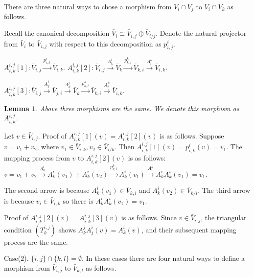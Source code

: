 \def\CTEXPreproc{Created by ctex v0.2.12, don't edit!}\documentclass[11pt]{article}
\newtheorem{lem}{Lemma}[section]
\begin{document}
 There are three natural ways to chose a morphism  from $V_i \cap V_j$ to $V_i \cap V_k$ as follows.

 Recall the canonical decomposition $\bar{V}_i \cong \bar{V}_{i,j} \oplus \bar{V}_{i/j}$. Denote the natural projector from $\bar{V}_i$ to $\bar{V}_{i,j}$ with respect to this decomposition as $p^i _{i,j}$.

 $A^{i,j} _{i,k} [1] :  \bar{V}_{i,j} \stackrel{ p^i _{i,k} }{\longrightarrow } \bar{V}_{i,k} $.
 $A^{i,j} _{i,k}[2] :  \bar{V}_{i,j} \stackrel{A^i _k }{\longrightarrow  } \bar{V}_k
  \stackrel{p^k _{k,i}}{\longrightarrow} \bar{V}_{k,i}\stackrel{A^k _i }{\longrightarrow} \bar{V}_{i,k} $.


  $A^{i,j} _{i,k} [3]: \bar{V}_{i,j}\stackrel{A^i _j }{\longrightarrow } \bar{V}_{j,i} \stackrel{ A^j _k }{\longrightarrow} \bar{V}_k
  \stackrel{ p^k _{k,i}}{\longrightarrow} \bar{V}_{k,i} \stackrel{A^k _i }{\longrightarrow } \bar{V}_{i,k} $.



\begin{lem}
Above three morphisms are the same. We denote this morphism as $A^{i,j}_{i,k} $.

\end{lem}

\begin{pf} Let $v\in \bar{V}_{i,j}$.
 Proof of $A^{i,j} _{i,k}[1](v)= A^{i,j} _{i,k}[2](v) $ is as follows.  Suppose $v=v_1 +v_2$, where $v_1 \in \bar{V}_{i,k}, v_2 \in \bar{V}_{i/k}$. Then
$A^{i,j} _{i,k}[1](v)= p^i _{i,k}(v)= v_1 $. The  mapping process from $v$ to $A^{i,j} _{i,k}[2](v)$  is as follows:
$ v= v_1 +v_2 \stackrel{ A^i _k }{\longrightarrow} A^i _k (v_1 ) + A^i _k (v_2 )\stackrel{p^k _{k,i}}{\longrightarrow}
  A^i _k (v_1 ) \stackrel{A^k _i }{\longrightarrow} A^i _k A^i _k (v_1 )=v_1  .$

  The second arrow is because $A^i _k (v_1 )\in \bar{V}_{k,i}  $ and $  A^i _k (v_2 )\in \bar{V}_{k/i} $. The third arrow is because
  $v_i \in \bar{V}_{i,k} $ so there is $ A^i _k A^i _k (v_1 )=v_1    $.

  Proof of $A^{i,j} _{i,k}[2](v)= A^{i,j} _{i,k}[3](v) $ is as follows. Since $v\in \bar{V}_{i,j}$,  the triangular condition $(T^{i,j}_k )$ shows $ A^j _k A^i _j (v) = A^i _k (v) $, and their subsequent  mapping process are the same.\\

\end{pf}

\noindent Case(2). $\{ i,j\} \cap \{ k,l\} =\emptyset$.
In these cases there are four natural ways to define a morphism from $\bar{V}_{i,j}$ to $\bar{V}_{k,l}$ as follows.
\end{document}
